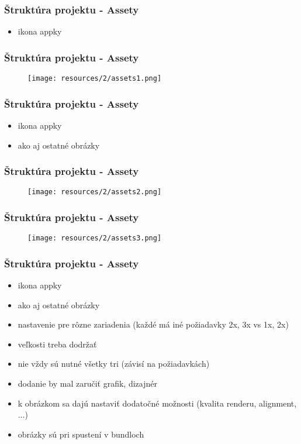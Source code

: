 \documentclass[serif,mathserif]{beamer}
\begin{document}
\begin{frame}
  \frametitle{Štruktúra projektu - Assety}
  \begin{itemize}
  \item ikona appky
  \end{itemize}
\end{frame}

\begin{frame}
  \frametitle{Štruktúra projektu - Assety}
 \begin{figure}[h]
	\texttt{[image: resources/2/assets1.png]}
  \end{figure}
\end{frame}

\begin{frame}
  \frametitle{Štruktúra projektu - Assety}
  \begin{itemize}
  \item ikona appky
  \item ako aj ostatné obrázky  
  \end{itemize}
\end{frame}

\begin{frame}
  \frametitle{Štruktúra projektu - Assety}
 \begin{figure}[h]
	\texttt{[image: resources/2/assets2.png]}
  \end{figure}
\end{frame}

\begin{frame}
  \frametitle{Štruktúra projektu - Assety}
 \begin{figure}[h]
	\texttt{[image: resources/2/assets3.png]}
  \end{figure}
\end{frame}

\begin{frame}
  \frametitle{Štruktúra projektu - Assety}
  \begin{itemize}
  \item ikona appky
  \item ako aj ostatné obrázky
  \item nastavenie pre rôzne zariadenia (každé má iné požiadavky 2x, 3x vs 1x, 2x)\pause
  \item veľkosti treba dodržať\pause
  \item nie vždy sú nutné všetky tri (závisí na požiadavkách)\pause
  \item dodanie by mal zaručiť grafik, dizajnér\pause
  \item k obrázkom sa dajú nastaviť dodatočné možnosti (kvalita renderu, alignment, ...)
    \item obrázky sú pri spustení v bundloch
  \end{itemize}
\end{frame}
\end{document}
